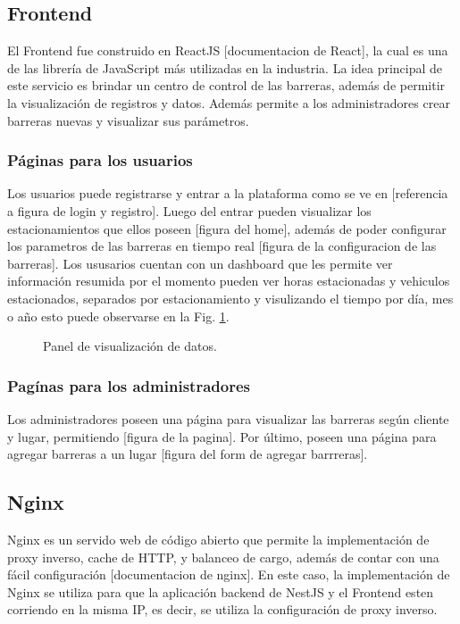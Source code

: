 \subsection{Frontend}

El Frontend fue construido en ReactJS [documentacion de React], la cual es una de las librería de JavaScript más utilizadas en la industria. La idea principal de este servicio es brindar un centro de control de las barreras, además de permitir la visualización de registros y datos. Además permite a los administradores crear barreras nuevas y visualizar sus parámetros.

\subsubsection*{Páginas para los usuarios}

Los usuarios puede registrarse y entrar a la plataforma como se ve en [referencia a figura de login y registro]. Luego del entrar pueden visualizar los estacionamientos que ellos poseen [figura del home], además de poder configurar los parametros de las barreras en tiempo real [figura de la configuracion de las barreras]. Los ususarios cuentan con un dashboard que les permite ver información resumida por el momento pueden ver horas estacionadas y vehiculos estacionados, separados por estacionamiento y visulizando el tiempo por día, mes o año esto puede observarse en la Fig. \ref{fig:dashboard}.


\begin{figure}
    \centering

    \caption{Panel de visualización de datos.}
    \label{fig:dashboard}
\end{figure}

\subsubsection*{Pagínas para los administradores}

Los administradores poseen una página para visualizar las barreras según cliente y lugar, permitiendo [figura de la pagina]. Por último, poseen una página para agregar barreras a un lugar [figura del form de agregar barrreras].

\subsection{Nginx}

Nginx es un servido web de código abierto que permite la implementación de proxy inverso, cache de HTTP, y balanceo de cargo, además de contar con una fácil configuración [documentacion de nginx].
En este caso, la implementación de Nginx se utiliza para que la aplicación backend de NestJS y el Frontend esten corriendo en la misma IP, es decir, se utiliza la configuración de proxy inverso.

